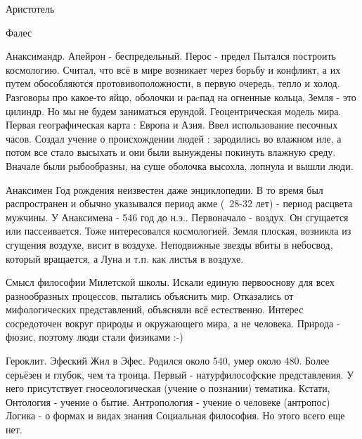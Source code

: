 Аристотель

Фалес

Анаксимандр.
Апейрон - беспредельный. Перос - предел
Пытался построить космологию. Считал, что всё в мире возникает через борьбу и конфликт, а их путем обособляются протовивоположности, в первую очередь, тепло и холод. Разговоры про какое-то яйцо, оболочки и раcпад на огненные кольца, Земля - это цилиндр. Но мы не будем заниматься ерундой. Геоцентрическая модель мира. Первая географическая карта : Европа и Азия. Ввел использование песочных часов. Создал учение о происхождении людей : зародились во влажном иле, а потом все стало высыхать и они были вынуждены покинуть влажную среду. Вначале были рыбообразны, на суше оболочка высохла, лопнула и вышли люди.

Анаксимен
Год рождения неизвестен даже энциклопедии. В то время был распространен и обычно указывался период акме (~28-32 лет) - период расцвета мужчины. У Анаксимена - 546 год до н.э..
Первоначало - воздух. Он сгущается или пассеивается. Тоже интересовался космологией. Земля плоская, возникла из сгущения воздухе, висит в воздухе. Неподвижные звезды вбиты в небосвод, который вращается, а Луна и т.п. как листья в воздухе.

Смысл философии Милетской школы. Искали единую первооснову для всех разнообразных процессов, пытались объяснить мир. Отказались от мифологических представлений, объясняли всё естественно. Интерес сосредоточен вокруг природы и окружающего мира, а не человека. Природа - фюзис, поэтому люди стали физиками :-)

Героклит. Эфеский
Жил в Эфес. Родился около 540, умер около 480. Более серьёзен и глубок, чем та троица. Первый - натурфилософские представления. У него присутствует гносеологическая (учение о познании) тематика. 
Кстати,
Онтология - учение о бытие.
Антропология - учение о человеке (антропос)
Логика - о формах и видах знания
Социальная философия. Но этого всего еще нет.

